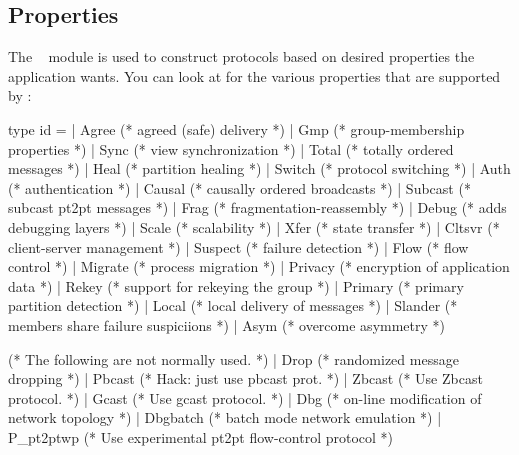 \subsection{Properties}
\label{sec:properties}

The \ensemble\  module is used to construct protocols based on
desired properties the application wants.  You can look at 
for the various properties that are supported by \ensemble:
\begin{codebox}
type id =
  | Agree       (* agreed (safe) delivery *)
  | Gmp	        (* group-membership properties *)
  | Sync        (* view synchronization *)
  | Total       (* totally ordered messages *)
  | Heal        (* partition healing *)
  | Switch      (* protocol switching *)
  | Auth        (* authentication *)
  | Causal      (* causally ordered broadcasts *)
  | Subcast     (* subcast pt2pt messages *)
  | Frag        (* fragmentation-reassembly *)
  | Debug       (* adds debugging layers *)
  | Scale       (* scalability *)
  | Xfer        (* state transfer *)
  | Cltsvr      (* client-server management *)
  | Suspect     (* failure detection *)
  | Flow        (* flow control *)
  | Migrate     (* process migration *)
  | Privacy     (* encryption of application data *)
  | Rekey       (* support for rekeying the group *)
  | Primary     (* primary partition detection *)
  | Local       (* local delivery of messages *)
  | Slander     (* members share failure suspiciions *)
  | Asym        (* overcome asymmetry *)

    (* The following are not normally used.
     *)
  | Drop        (* randomized message dropping *)
  | Pbcast      (* Hack: just use pbcast prot. *)
  | Zbcast      (* Use Zbcast protocol. *)
  | Gcast       (* Use gcast protocol. *)
  | Dbg         (* on-line modification of network topology *)
  | Dbgbatch    (* batch mode network emulation *)
  | P_pt2ptwp   (* Use experimental pt2pt flow-control protocol *)
\end{codebox}

